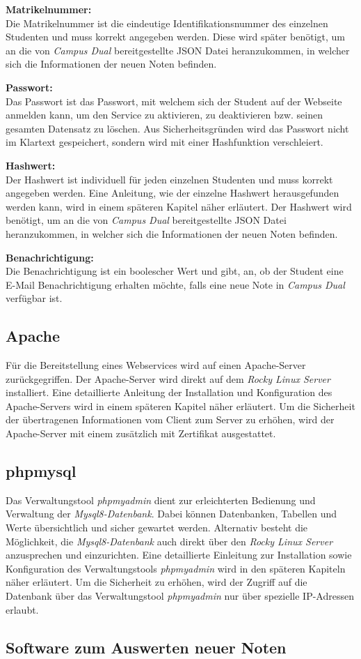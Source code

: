 \textbf{Matrikelnummer:}\\
Die Matrikelnummer ist die eindeutige Identifikationsnummer des einzelnen Studenten und muss korrekt angegeben werden.
Diese wird später benötigt, um an die von \textit{Campus Dual} bereitgestellte \ac{JSON} Datei heranzukommen, in welcher sich die Informationen der neuen Noten befinden.

\textbf{Passwort:}\\
Das Passwort ist das Passwort, mit welchem sich der Student auf der Webseite anmelden kann, um den Service zu aktivieren, zu deaktivieren bzw. seinen gesamten Datensatz zu löschen.
Aus Sicherheitsgründen wird das Passwort nicht im Klartext gespeichert, sondern wird mit einer Hashfunktion verschleiert.

\textbf{Hashwert:}\\
Der Hashwert ist individuell für jeden einzelnen Studenten und muss korrekt angegeben werden.
Eine Anleitung, wie der einzelne Hashwert herausgefunden werden kann, wird in einem späteren Kapitel näher erläutert.
Der Hashwert wird benötigt, um an die von \textit{Campus Dual} bereitgestellte \ac{JSON} Datei heranzukommen, in welcher sich die Informationen der neuen Noten befinden.

\textbf{Benachrichtigung:}\\
Die Benachrichtigung ist ein boolescher Wert und gibt, an, ob der Student eine E-Mail Benachrichtigung erhalten möchte, falls eine neue Note in \textit{Campus Dual} verfügbar ist.

\subsection{Apache}
Für die Bereitstellung eines Webservices wird auf einen Apache-Server zurückgegriffen.
Der Apache-Server wird direkt auf dem \textit{Rocky Linux Server} installiert.
Eine detaillierte Anleitung der Installation und Konfiguration des Apache-Servers wird in einem späteren Kapitel näher erläutert.
Um die Sicherheit der übertragenen Informationen vom Client zum Server zu erhöhen, wird der Apache-Server mit einem zusätzlich mit Zertifikat ausgestattet.

\subsection{phpmysql}
Das Verwaltungstool \textit{phpmyadmin} dient zur erleichterten Bedienung und Verwaltung der \textit{Mysql8-Datenbank}.
Dabei können Datenbanken, Tabellen und Werte übersichtlich und sicher gewartet werden.
Alternativ besteht die Möglichkeit, die \textit{Mysql8-Datenbank} auch direkt über den \textit{Rocky Linux Server} anzusprechen und einzurichten.
Eine detaillierte Einleitung zur Installation sowie Konfiguration des Verwaltungstools \textit{phpmyadmin} wird in den späteren Kapiteln näher erläutert.
Um die Sicherheit zu erhöhen, wird der Zugriff auf die Datenbank über das Verwaltungstool \textit{phpmyadmin} nur über spezielle IP-Adressen erlaubt.

\subsection{Software zum Auswerten neuer Noten}

